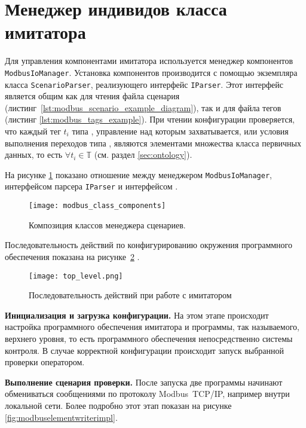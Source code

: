 \section{Менеджер индивидов класса \mbwriter имитатора}
Для управления компонентами имитатора используется менеджер компонентов \texttt{ModbusIoManager}.
Установка компонентов производится с помощью экземпляра класса \texttt{ScenarioParser}, реализующего интерфейс \texttt{IParser}.
Этот интерфейс является общим как для чтения файла сценария (листинг~\ref{lst:modbus_scenario_example_diagram}),
так и для файла тегов (листинг \ref{lst:modbus_tags_example}).
При чтении конфигурации проверяется, что каждый тег $t_i$ типа \mbdata,
управление над которым захватывается, или условия выполнения переходов типа \mbrelationed,
являются элементами множества класса первичных данных, то есть $\forall t_i \in \mathbb{T}$ (см. раздел \ref{sec:ontology}).

На рисунке \ref{fig:modbus_class_components} показано отношение между менеджером \texttt{ModbusIoManager},
интерфейсом парсера \texttt{IParser} и интерфейсом \mbwriter.
\begin{center}
    \begin{figure}[hb!]
        \texttt{[image: modbus\_class\_components]}
        \caption{Композиция классов менеджера сценариев.}\label{fig:modbus_class_components}
    \end{figure}
\end{center}


Последовательность действий по конфигурированию окружения программного обеспечения
показана на рисунке~\ref{fig:top_level_sequence} \cite[стр. 239]{book:oop:oop_analize}.
\begin{center}
    \begin{figure}
        \texttt{[image: top\_level.png]}
        \caption{Последовательность действий при работе с имитатором}
        \label{fig:top_level_sequence}
    \end{figure}
\end{center}

\textbf{Инициализация и загрузка конфигурации.}
На этом этапе происходит настройка программного обеспечения
имитатора и программы, так называемого, верхнего уровня,
то есть программного обеспечения непосредственно системы контроля.
В случае корректной конфигурации происходит запуск
выбранной проверки оператором.

\textbf{Выполнение сценария проверки.}
После запуска две программы начинают обмениваться 
сообщениями по протоколу Modbus~TCP/IP, например внутри локальной сети.
Более подробно этот этап показан на рисунке \ref{fig:modbuselementwriterimpl}.

